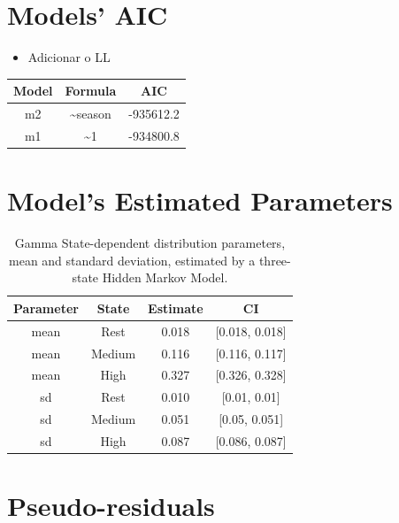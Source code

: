 \documentclass[english,msc,numbers,hidelinks]{coppe}
\providecommand{\tightlist}{%
  \setlength{\itemsep}{0pt}\setlength{\parskip}{0pt}}
\begin{document}
  \hypertarget{models-aic}{%
  \chapter{Models' AIC}\label{models-aic}}
  \begin{itemize}
  \tightlist
  \item
    Adicionar o LL
  \end{itemize}
  \begin{table}[!h]
  \centering
  \begin{tabular}{ccc}
  \toprule
  Model & Formula & AIC\\
  \midrule
  m2 & \textasciitilde{}season & -935612.2\\
  m1 & \textasciitilde{}1 & -934800.8\\
  \bottomrule
  \end{tabular}
  \end{table}
  \hypertarget{models-estimated-parameters}{%
  \chapter{Model's Estimated Parameters}\label{models-estimated-parameters}}
  \begin{table}[!h]

  \caption{\label{tab:table-parameters}Gamma State-dependent distribution parameters, mean and standard deviation, estimated by a three-state Hidden Markov Model.}
  \centering
  \begin{tabular}[t]{cccc}
  \toprule
  Parameter & State & Estimate & CI\\
  \midrule
  mean & Rest & 0.018 & {}[0.018, 0.018]\\
  mean & Medium & 0.116 & {}[0.116, 0.117]\\
  mean & High & 0.327 & {}[0.326, 0.328]\\
  sd & Rest & 0.010 & {}[0.01, 0.01]\\
  sd & Medium & 0.051 & {}[0.05, 0.051]\\
  \addlinespace
  sd & High & 0.087 & {}[0.086, 0.087]\\
  \bottomrule
  \end{tabular}
  \end{table}
  \hypertarget{pseudo-residuals}{%
  \chapter{Pseudo-residuals}\label{pseudo-residuals}}
\end{document}
